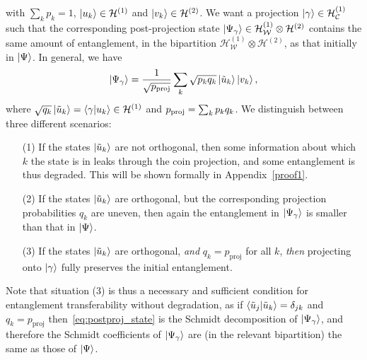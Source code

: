 \documentclass[
	aps, pra,
	superscriptaddress, twocolumn,
	floatfix,
	10pt
]{revtex4-1}
\newcommand{\bs}[1]{\boldsymbol{#1}}
\newcommand{\on}[1]{\operatorname{#1}}
\newcommand{\calC}{{\mathcal{C}}}
\newcommand{\calH}{{\mathcal{H}}}
\newcommand{\calW}{{\mathcal{W}}}
\newcommand{\HC}{\calH_\calC}
\newcommand{\HW}{\calH_\calW}
\begin{document}
with $\sum_k p_k=1$, $\ket{u_k}\in{\cal H}^{(1)}$ and $\ket{v_k}\in{\cal H}^{(2)}$. %
We want a projection $\ket\gamma\in\HC^{(1)}$ such that the corresponding post-projection state $\ket{\Psi_\gamma}\in\HW^{(1)}\otimes\calH^{(2)}$ contains the same amount of entanglement, in the bipartition $\HW^{(1)}\otimes\calH^{(2)}$, as that initially in $\ket\Psi$.
In general, we have
\begin{equation}
    \ket{\Psi_\gamma} = \frac{1}{\sqrt{p_{\rm proj}}}
    \sum_k \sqrt{p_k q_k} \ket{\tilde u_k}\ket{v_k},
    \label{eq:postproj_state}
\end{equation}
where
$\sqrt{q_k}\ket{\tilde u_k}= \braket\gamma{u_k}\in{\cal H}^{(1)}$
and
$p_{\rm proj} = \sum_k p_k q_k$.
We distinguish between three different scenarios:
\begin{enumerate}
\item[(1)]If the states $\ket{\tilde u_k}$ are not orthogonal, then some information about which $k$ the state is in leaks through the coin projection, and some  entanglement is thus degraded. This will be shown formally in Appendix~\ref{proof1}.\\
\item[(2)] If the states $\ket{\tilde u_k}$ are orthogonal, but the corresponding projection probabilities $q_k$ are uneven, then again the entanglement in $\ket{\Psi_\gamma}$ is smaller than that in $\ket\Psi$.\\
\item[(3)] If the states $\ket{\tilde u_k}$ are orthogonal, \emph{and} $q_k=p_{\on{proj}}$ for all $k$, \textit{then} projecting onto $\ket\gamma$ fully preserves the initial entanglement.
\end{enumerate}
Note that situation (3) is thus a necessary and sufficient condition for entanglement transferability without degradation,
as if $\braket{\tilde u_j}{\tilde u_k}=\delta_{jk}$ and $q_k=p_{\on{proj}}$ then~\cref{eq:postproj_state} is the Schmidt decomposition of $\ket{\Psi_\gamma}$, and therefore the Schmidt coefficients of $\ket{\Psi_\gamma}$ are (in the relevant bipartition) the same as those of $\ket{\Psi}$.
\end{document}

